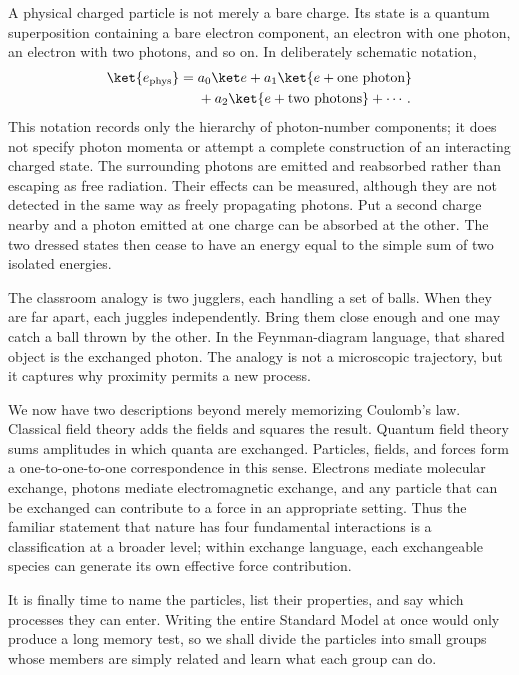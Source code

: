 A physical charged particle is not merely a bare charge. Its state is a quantum superposition containing a bare electron component, an electron with one photon, an electron with two photons, and so on. In deliberately schematic notation,
\begin{equation}
\begin{aligned}
\ket{e_{\mathrm{phys}}}
={}&a_0\ket e
+a_1\ket{e+\text{one photon}}
\\
&+a_2\ket{e+\text{two photons}}+\cdots .
\end{aligned}
\end{equation}
This notation records only the hierarchy of photon-number components; it does not specify photon momenta or attempt a complete construction of an interacting charged state.
The surrounding photons are emitted and reabsorbed rather than escaping as free radiation. Their effects can be measured, although they are not detected in the same way as freely propagating photons. Put a second charge nearby and a photon emitted at one charge can be absorbed at the other. The two dressed states then cease to have an energy equal to the simple sum of two isolated energies.

The classroom analogy is two jugglers, each handling a set of balls. When they are far apart, each juggles independently. Bring them close enough and one may catch a ball thrown by the other. In the Feynman-diagram language, that shared object is the exchanged photon. The analogy is not a microscopic trajectory, but it captures why proximity permits a new process.

We now have two descriptions beyond merely memorizing Coulomb's law. Classical field theory adds the fields and squares the result. Quantum field theory sums amplitudes in which quanta are exchanged. Particles, fields, and forces form a one-to-one-to-one correspondence in this sense. Electrons mediate molecular exchange, photons mediate electromagnetic exchange, and any particle that can be exchanged can contribute to a force in an appropriate setting. Thus the familiar statement that nature has four fundamental interactions is a classification at a broader level; within exchange language, each exchangeable species can generate its own effective force contribution.

It is finally time to name the particles, list their properties, and say which processes they can enter. Writing the entire Standard Model at once would only produce a long memory test, so we shall divide the particles into small groups whose members are simply related and learn what each group can do.

